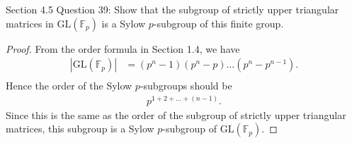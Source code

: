 Section 4.5 Question 39: Show that the subgroup of strictly upper
triangular matrices in $\text{GL}(\mathbb{F}_p)$ is a Sylow $p$-subgroup of
this finite group.

\begin{proof}
  From the order formula in Section 1.4, we have
  \begin{align*}
    |\text{GL}(\mathbb{F}_p)| &= (p^n-1)(p^n-p)\ldots(p^n-p^{n-1}). \\
  \end{align*}
  Hence the order of the Sylow $p$-subgroups should be
  \begin{align*}
    p^{1+2+\ldots+(n-1)}.
  \end{align*}
  Since this is the same as the order of the subgroup of strictly upper
  triangular matrices, this subgroup is a Sylow $p$-subgroup of
  $\text{GL}(\mathbb{F}_p)$.
\end{proof}
